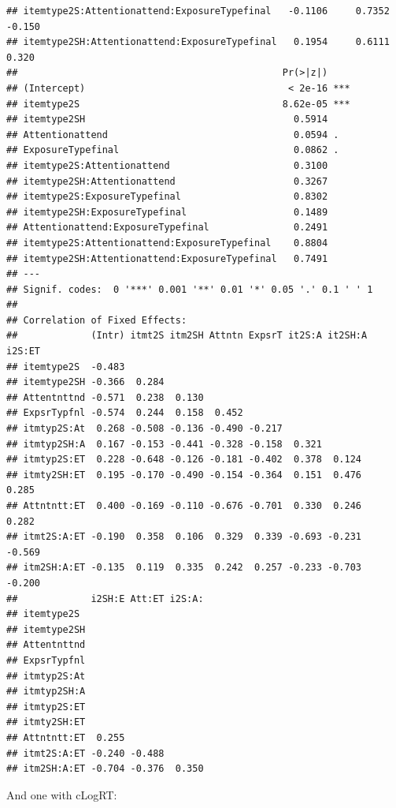 \documentclass[11pt]{article}\usepackage[]{graphicx}\usepackage[]{color}
\makeatletter
\newenvironment{kframe}{%
 \def\at@end@of@kframe{}%
 \ifinner\ifhmode%
  \def\at@end@of@kframe{\end{minipage}}%
  \begin{minipage}{\columnwidth}%
 \fi\fi%
 \def\FrameCommand##1{\hskip\@totalleftmargin \hskip-\fboxsep
 \colorbox{shadecolor}{##1}\hskip-\fboxsep
     \hskip-\linewidth \hskip-\@totalleftmargin \hskip\columnwidth}%
 \MakeFramed {\advance\hsize-\width
   \@totalleftmargin\z@ \linewidth\hsize
   \@setminipage}}%
 {\par\unskip\endMakeFramed%
 \at@end@of@kframe}
\newenvironment{knitrout}{}{} %
\makeatother
\begin{document}
\begin{knitrout}
\begin{kframe}
\begin{verbatim}
## itemtype2S:Attentionattend:ExposureTypefinal   -0.1106     0.7352  -0.150
## itemtype2SH:Attentionattend:ExposureTypefinal   0.1954     0.6111   0.320
##                                               Pr(>|z|)    
## (Intercept)                                    < 2e-16 ***
## itemtype2S                                    8.62e-05 ***
## itemtype2SH                                     0.5914    
## Attentionattend                                 0.0594 .  
## ExposureTypefinal                               0.0862 .  
## itemtype2S:Attentionattend                      0.3100    
## itemtype2SH:Attentionattend                     0.3267    
## itemtype2S:ExposureTypefinal                    0.8302    
## itemtype2SH:ExposureTypefinal                   0.1489    
## Attentionattend:ExposureTypefinal               0.2491    
## itemtype2S:Attentionattend:ExposureTypefinal    0.8804    
## itemtype2SH:Attentionattend:ExposureTypefinal   0.7491    
## ---
## Signif. codes:  0 '***' 0.001 '**' 0.01 '*' 0.05 '.' 0.1 ' ' 1
## 
## Correlation of Fixed Effects:
##             (Intr) itmt2S itm2SH Attntn ExpsrT it2S:A it2SH:A i2S:ET
## itemtype2S  -0.483                                                  
## itemtype2SH -0.366  0.284                                           
## Attentnttnd -0.571  0.238  0.130                                    
## ExpsrTypfnl -0.574  0.244  0.158  0.452                             
## itmtyp2S:At  0.268 -0.508 -0.136 -0.490 -0.217                      
## itmtyp2SH:A  0.167 -0.153 -0.441 -0.328 -0.158  0.321               
## itmtyp2S:ET  0.228 -0.648 -0.126 -0.181 -0.402  0.378  0.124        
## itmty2SH:ET  0.195 -0.170 -0.490 -0.154 -0.364  0.151  0.476   0.285
## Attntntt:ET  0.400 -0.169 -0.110 -0.676 -0.701  0.330  0.246   0.282
## itmt2S:A:ET -0.190  0.358  0.106  0.329  0.339 -0.693 -0.231  -0.569
## itm2SH:A:ET -0.135  0.119  0.335  0.242  0.257 -0.233 -0.703  -0.200
##             i2SH:E Att:ET i2S:A:
## itemtype2S                      
## itemtype2SH                     
## Attentnttnd                     
## ExpsrTypfnl                     
## itmtyp2S:At                     
## itmtyp2SH:A                     
## itmtyp2S:ET                     
## itmty2SH:ET                     
## Attntntt:ET  0.255              
## itmt2S:A:ET -0.240 -0.488       
## itm2SH:A:ET -0.704 -0.376  0.350
\end{verbatim}
\end{kframe}
\end{knitrout}

And one with cLogRT:
\end{document}
